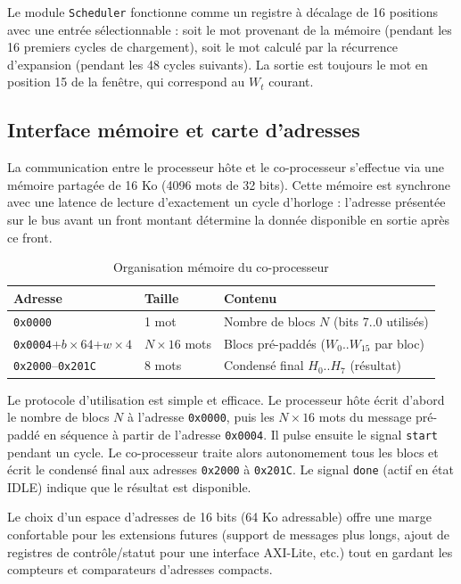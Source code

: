 Le module \texttt{Scheduler} fonctionne comme un registre à décalage de 16 positions avec une entrée sélectionnable : soit le mot provenant de la mémoire (pendant les 16 premiers cycles de chargement), soit le mot calculé par la récurrence d'expansion (pendant les 48 cycles suivants). La sortie est toujours le mot en position 15 de la fenêtre, qui correspond au $W_t$ courant.

\subsection{Interface mémoire et carte d'adresses}

La communication entre le processeur hôte et le co-processeur s'effectue via une mémoire partagée de 16 Ko (4096 mots de 32 bits). Cette mémoire est synchrone avec une latence de lecture d'exactement un cycle d'horloge : l'adresse présentée sur le bus avant un front montant détermine la donnée disponible en sortie après ce front.

\begin{table}[H]
\centering
\caption{Organisation mémoire du co-processeur}
\label{tab:memmap}
\begin{tabular}{lll}
\toprule
\textbf{Adresse} & \textbf{Taille} & \textbf{Contenu} \\
\midrule
\texttt{0x0000} & 1 mot & Nombre de blocs $N$ (bits 7..0 utilisés) \\
\texttt{0x0004}+$b{\times}64$+$w{\times}4$ & $N{\times}16$ mots & Blocs pré-paddés ($W_0..W_{15}$ par bloc) \\
\texttt{0x2000}--\texttt{0x201C} & 8 mots & Condensé final $H_0..H_7$ (résultat) \\
\bottomrule
\end{tabular}
\end{table}

Le protocole d'utilisation est simple et efficace. Le processeur hôte écrit d'abord le nombre de blocs $N$ à l'adresse \texttt{0x0000}, puis les $N \times 16$ mots du message pré-paddé en séquence à partir de l'adresse \texttt{0x0004}. Il pulse ensuite le signal \texttt{start} pendant un cycle. Le co-processeur traite alors autonomement tous les blocs et écrit le condensé final aux adresses \texttt{0x2000} à \texttt{0x201C}. Le signal \texttt{done} (actif en état IDLE) indique que le résultat est disponible.

Le choix d'un espace d'adresses de 16 bits (64 Ko adressable) offre une marge confortable pour les extensions futures (support de messages plus longs, ajout de registres de contrôle/statut pour une interface AXI-Lite, etc.) tout en gardant les compteurs et comparateurs d'adresses compacts.

